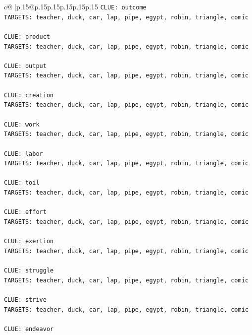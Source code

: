 \documentclass{article}
\begin{document}
{\begin{supertabular}{c@{$\;$}|p{.15\linewidth}@{}p{.15\linewidth}p{.15\linewidth}p{.15\linewidth}p{.15\linewidth}p{.15\linewidth}}
{{{\texttt{CLUE: outcome} \\
\texttt{TARGETS: teacher, duck, car, lap, pipe, egypt, robin, triangle, comic} \\
\\ 
\texttt{CLUE: product} \\
\texttt{TARGETS: teacher, duck, car, lap, pipe, egypt, robin, triangle, comic} \\
\\ 
\texttt{CLUE: output} \\
\texttt{TARGETS: teacher, duck, car, lap, pipe, egypt, robin, triangle, comic} \\
\\ 
\texttt{CLUE: creation} \\
\texttt{TARGETS: teacher, duck, car, lap, pipe, egypt, robin, triangle, comic} \\
\\ 
\texttt{CLUE: work} \\
\texttt{TARGETS: teacher, duck, car, lap, pipe, egypt, robin, triangle, comic} \\
\\ 
\texttt{CLUE: labor} \\
\texttt{TARGETS: teacher, duck, car, lap, pipe, egypt, robin, triangle, comic} \\
\\ 
\texttt{CLUE: toil} \\
\texttt{TARGETS: teacher, duck, car, lap, pipe, egypt, robin, triangle, comic} \\
\\ 
\texttt{CLUE: effort} \\
\texttt{TARGETS: teacher, duck, car, lap, pipe, egypt, robin, triangle, comic} \\
\\ 
\texttt{CLUE: exertion} \\
\texttt{TARGETS: teacher, duck, car, lap, pipe, egypt, robin, triangle, comic} \\
\\ 
\texttt{CLUE: struggle} \\
\texttt{TARGETS: teacher, duck, car, lap, pipe, egypt, robin, triangle, comic} \\
\\ 
\texttt{CLUE: strive} \\
\texttt{TARGETS: teacher, duck, car, lap, pipe, egypt, robin, triangle, comic} \\
\\ 
\texttt{CLUE: endeavor} \\
}}}
\end{supertabular}}
\end{document}
